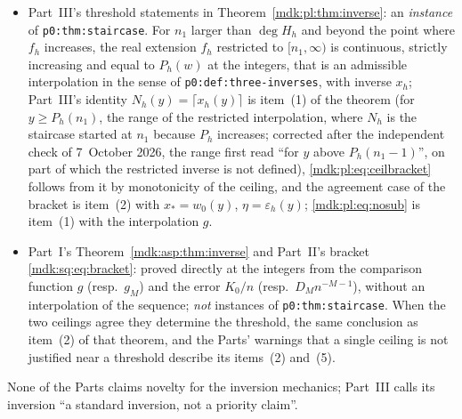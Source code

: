 \documentclass[11pt,letterpaper]{article}
\numberwithin{equation}{section}
\theoremstyle{remark}\newtheorem{remark}[theorem]{Remark}
\newcommand{\file}[1]{\nolinkurl{#1}}
\begin{document}
\begin{itemize}
\item Part~III's threshold statements in Theorem~\ref{mdk:pl:thm:inverse}: an \emph{instance} of \file{p0:thm:staircase}. For $n_1$ larger than $\deg H_h$ and beyond the point where $f_h$ increases, the real extension $f_h$ restricted to $[n_1,\infty)$ is continuous, strictly increasing and equal to $P_h(w)$ at the integers, that is an admissible interpolation in the sense of \file{p0:def:three-inverses}, with inverse $x_h$; Part~III's identity $N_h(y)=\lceil x_h(y)\rceil$ is item~(1) of the theorem (for $y\ge P_h(n_1)$, the range of the restricted interpolation, where $N_h$ is the staircase started at $n_1$ because $P_h$ increases; \textup{corrected after the independent check of 7~October 2026, the range first read ``for $y$ above $P_h(n_1-1)$'', on part of which the restricted inverse is not defined}), \eqref{mdk:pl:eq:ceilbracket} follows from it by monotonicity of the ceiling, and the agreement case of the bracket is item~(2) with $x_\ast=w_0(y)$, $\eta=\varepsilon_h(y)$; \eqref{mdk:pl:eq:nosub} is item~(1) with the interpolation $g$.
\item Part~I's Theorem~\ref{mdk:asp:thm:inverse} and Part~II's bracket \eqref{mdk:sq:eq:bracket}: proved directly at the integers from the comparison function $g$ (resp.\ $g_M$) and the error $K_0/n$ (resp.\ $D_Mn^{-M-1}$), without an interpolation of the sequence; \emph{not} instances of \file{p0:thm:staircase}. When the two ceilings agree they determine the threshold, the same conclusion as item~(2) of that theorem, and the Parts' warnings that a single ceiling is not justified near a threshold describe its items~(2) and~(5).
\end{itemize}
None of the Parts claims novelty for the inversion mechanics; Part~III calls its inversion ``a standard inversion, not a priority claim''.
\end{document}
